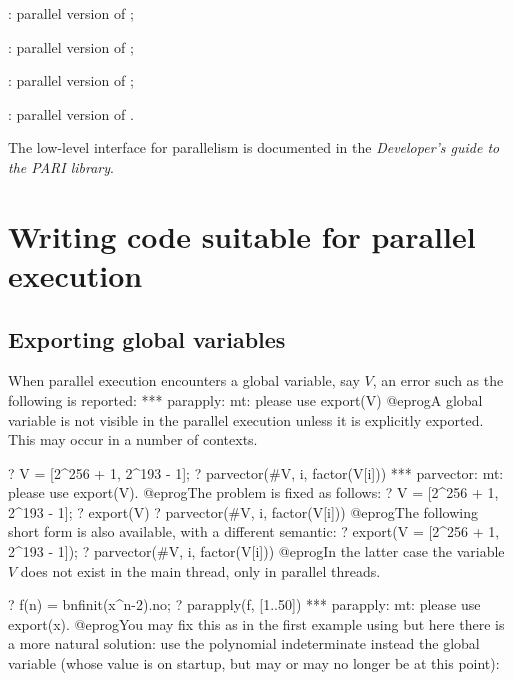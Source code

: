 \item {}:    parallel version of ;

\item {}:   parallel version of ;

\item {}: parallel version of ;

\item {}: parallel version of .

The low-level  interface for parallelism is documented
in the \emph{Developer's guide to the PARI library}.
\newpage

\chapter{Writing code suitable for parallel execution}

\section{Exporting global variables}

When parallel execution encounters a global variable, say $V$,
an error such as the following is reported:
\bprog
  *** parapply: mt: please use export(V)
@eprog\noindent A global variable is not visible in the parallel execution
unless it is explicitly exported. This may occur in a number of contexts.


\bprog
? V = [2^256 + 1, 2^193 - 1];
? parvector(#V, i, factor(V[i]))
  *** parvector: mt: please use export(V).
@eprog\noindent The problem is fixed as follows:
\bprog
? V = [2^256 + 1, 2^193 - 1];
? export(V)
? parvector(#V, i, factor(V[i]))
@eprog\noindent The following short form is also available, with a different
semantic:
\bprog
? export(V = [2^256 + 1, 2^193 - 1]);
? parvector(#V, i, factor(V[i]))
@eprog\noindent In the latter case the variable $V$ does not exist in the
main thread, only in parallel threads.


\bprog
? f(n) = bnfinit(x^n-2).no;
? parapply(f, [1..50])
  *** parapply: mt: please use export(x).
@eprog\noindent You may fix this as in the first example using 
but here there is a more natural solution: use the polynomial indeterminate
 instead the global variable  (whose value is  on
startup, but may or may no longer be  at this point):

